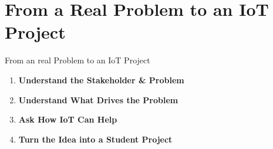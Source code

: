 \part[nopartpage]{From a Real Problem to an IoT Project}

\begin{frame}{From an real Problem to an IoT Project}
\begin{enumerate}
    \item \textbf{Understand the Stakeholder \& Problem}\\
    \item \textbf{Understand What Drives the Problem}\\
    \item \textbf{Ask How IoT Can Help}\\
    \item \textbf{Turn the Idea into a Student Project}\\
\end{enumerate}
\end{frame}
